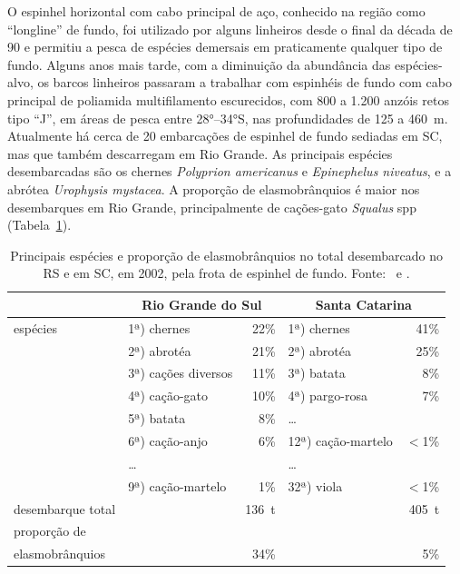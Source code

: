\documentclass[a4paper,11pt,twoside,showtrims,onecolumn,openright,final]{memoir}
\begin{document}
O espinhel horizontal com cabo principal de aço, conhecido na região como ``longline'' de fundo, 
foi utilizado por alguns linheiros desde o final da década de 90 e permitiu a pesca de espécies 
demersais em praticamente qualquer tipo de fundo. Alguns anos mais tarde, com a diminuição 
da abundância das espécies-alvo, os barcos linheiros passaram a trabalhar com 
espinhéis de fundo com cabo principal de poliamida multifilamento escurecidos, com 800 a 1.200 
anzóis retos tipo ``J'', em áreas de pesca entre 28°--34°S, nas 
profundidades de 125 a 460~m. Atualmente há cerca de 20 embarcações de espinhel de fundo sediadas em SC,
mas que também descarregam em Rio Grande. As principais espécies desembarcadas são os chernes
\emph{Polyprion americanus} e \emph{Epinephelus niveatus}, e a abrótea \emph{Urophysis mystacea}.
A proporção de elasmobrânquios é maior nos desembarques em Rio Grande, principalmente de
cações-gato \emph{Squalus} spp (Tabela~\ref{tab:capturas-espinheldefundo}).


\begin{table}
\caption[Principais espécies e proporção de elasmobrânquios no total desembarcado no RS e em SC, em 2002,
	 pela frota de espinhel de fundo.]
	{Principais espécies e proporção de elasmobrânquios no total desembarcado no RS e em SC, em 2002,
	 pela frota de espinhel de fundo. Fonte: \citet{ceperg2003}\ e \citet{univali2003}.}
\label{tab:capturas-espinheldefundo}
\begin{center}
\begin{tabular*}{\textwidth}{l@{\extracolsep{\fill}}lrlr}
\toprule
		& \multicolumn{2}{c}{Rio Grande do Sul} & \multicolumn{2}{c}{Santa Catarina} \\
\midrule
espécies 	& 1ª) chernes		& 22\%	& 1ª) chernes		  & 41\%	\\
		& 2ª) abrotéa		& 21\%	& 2ª) abrotéa 		  & 25\%	\\
		& 3ª) cações diversos	& 11\%	& 3ª) batata 		  & 8\%		\\
		& 4ª) cação-gato	& 10\%	& 4ª) pargo-rosa	  & 7\%		\\
		& 5ª) batata 		& 8\%	& \ldots 		  &		\\
		& 6ª) cação-anjo	& 6\%	& 12ª) cação-martelo  	  & $<$1\%	\\
		& \ldots 		& 	& \ldots 		  &		\\
		& 9ª) cação-martelo	& 1\%	& 32ª) viola	  	  & $<$1\%	\\
\midrule
desembarque total & 			& 136~t& 			  & 405~t	\\
\midrule
proporção de	& 			&	& 			  & 		\\
elasmobrânquios	& 			& 34\%	& 			  & 5\%		\\
\bottomrule
\end{tabular*}
\end{center}
\end{table}
\end{document}
